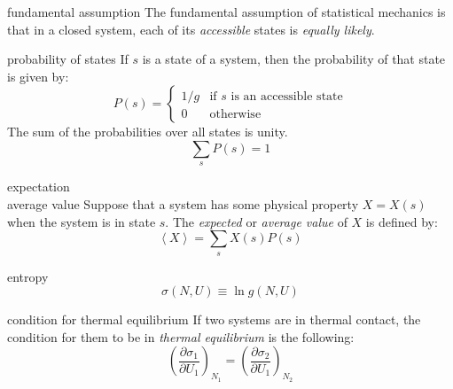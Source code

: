 \documentclass[avery5371,grid]{flashcards}
\begin{document}
\begin{flashcard}[Assumption]{fundamental assumption}
The fundamental assumption of statistical mechanics is that in a closed system,
each of its \textit{accessible} states is \textit{equally likely}.
\end{flashcard}

\begin{flashcard}[Definition]{probability of states}
If $s$ is a state of a system, then the probability of that
state is given by:
\begin{equation*}
P(s) = \left\{ \begin{array}{cl}
1/g & \text{if $s$ is an accessible state} \\
0   & \text{otherwise}
\end{array} \right.
\end{equation*}
The sum of the probabilities over all states is unity.
\begin{equation*}
\sum_{s} P(s) = 1
\end{equation*}
\end{flashcard}

\begin{flashcard}[Definition]{expectation\\average value}
Suppose that a system has some physical property $X=X(s)$ when the
system is in state $s$.  The \textit{expected} or \textit{average value} of $X$ is 
defined by:
\begin{equation*}
\left\langle X \right\rangle = \sum_{s} X(s)P(s)
\end{equation*}
\end{flashcard}

\begin{flashcard}[Definition]{entropy}
\begin{equation*}
\sigma(N,U) \equiv \ln g(N,U)
\end{equation*}
\end{flashcard}

\begin{flashcard}[Equation]{condition for thermal equilibrium}
If two systems are in thermal contact, the condition for them
to be in \textit{thermal equilibrium} is the following:
\begin{equation*}
\left(
\dfrac{\partial \sigma_{1}}{\partial U_{1}}
\right)_{\!\!\! N_1} = \left(
\dfrac{\partial \sigma_{2}}{\partial U_{1}}
\right)_{\!\!\! N_2}
\end{equation*}
\end{flashcard}
\end{document}
